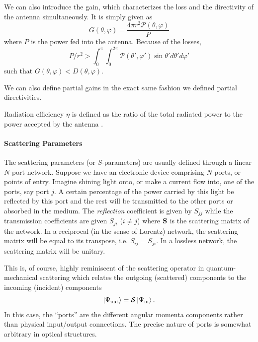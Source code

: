 We can also introduce the gain, which characterizes the loss
and the directivity of the antenna simultaneously. It is simply given
as
  \begin{equation}
    G(\theta,\varphi) = \frac{4\pi r^2\mathcal{P}(\theta,\varphi)}{P}
  \end{equation}
where $P$ is the power fed into the antenna. Because of the 
losses, 
	\begin{equation*}
		P/r^2>\int_0^\pi\int_0^{2\pi}\mathcal{P}(\theta',\varphi')\sin\theta'd\theta'd\varphi'
	\end{equation*}
such that $G(\theta,\varphi)<D(\theta,\varphi)$. 

We can also define partial gains in the exact same fashion we defined partial
directivities.

Radiation efficiency $\eta$ is defined as the ratio of the total radiated power 
to the power accepted by the antenna \cite{IEEE145-1993}.

\paragraph{Scattering Parameters}
The scattering parameters (or $S$-parameters) are
usually defined through a linear $N$-port network. 
Suppose we have an electronic device comprising
$N$ ports, or points of entry. Imagine shining light onto, 
or make a current flow into,
one of the ports, say port $j$. A certain percentage
of the power carried by this light be reflected 
by this port and the rest will be transmitted to the
other ports or absorbed in the medium. The \textit{reflection}
coefficient is given by $S_{jj}$ while the transmission
coefficients are given $S_{ji}$ ($i\neq j$) where $\mathbf{S}$
is the scattering matrix of the network. In a reciprocal (in the sense
of Lorentz) network, the scattering matrix will be equal to its
transpose, i.e. $S_{ij}=S_{ji}$. In a lossless network, the scattering
matrix will be unitary. 

This is, of course, highly reminiscent of the scattering operator
in quantum-mechanical scattering which relates the outgoing (scattered)
components to the incoming (incident) components
  \begin{equation}
   \Ket{\Psi_\text{out}}=\mathcal{S}\Ket{\Psi_\text{in}}.
  \end{equation}
In this case, the ``ports'' are the different angular momenta
components rather than physical input/output connections. 
The precise nature of ports is somewhat arbitrary in optical structures.

